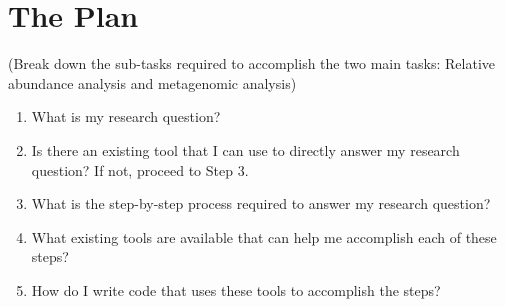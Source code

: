 
\chapter{The Plan}
(Break down the sub-tasks required to accomplish the two main tasks: Relative abundance analysis and metagenomic analysis)

%
\begin{enumerate}
    \item What is my research question?
    \item Is there an existing tool that I can use to directly answer my research question? If not, proceed to Step 3.
    \item What is the step-by-step process required to answer my research question?
    \item What existing tools are available that can help me accomplish each of these steps?
    \item How do I write code that uses these tools to accomplish the steps?
\end{enumerate}
%
